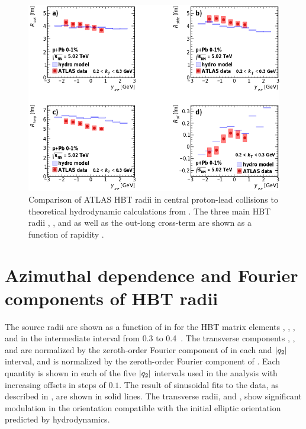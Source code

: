 \begin{figure}[t]
\centering
\includegraphics[width=\linewidth]{theory_bozek_kys.png}
\caption{Comparison of ATLAS HBT radii in central proton-lead collisions to theoretical hydrodynamic calculations from . The three main HBT radii \Rout, \Rside, and \Rlong as well as the out-long cross-term \Rol are shown as a function of rapidity \kys.}
\label{fig:results_theory_kys}
\end{figure}

\FloatBarrier
\section{Azimuthal dependence and Fourier components of HBT radii}

The source radii are shown as a function of \tdpk in \Fig{\ref{fig:Rosl_vs_phi}} for the \ac{HBT} matrix elements \Rout, \Rside, \Rlong, and \Ros in the intermediate \kt interval from 0.3 to 0.4\ \GeV.
The transverse components \Rout, \Rside, and \Ros are normalized by the zeroth-order Fourier component of \Rside in each \kt and $|q_{2}|$ interval, and \Rlong is normalized by the zeroth-order Fourier component of \Rlong.
Each quantity is shown in each of the five $|q_{2}|$ intervals used in the analysis with increasing offsets in steps of $0.1$.
The result of sinusoidal fits to the data, as described in \Sect{\ref{subsec:azi_correlations}}, are shown in solid lines.
The transverse radii, \Rout and \Rside, show significant modulation in the orientation compatible with the initial elliptic orientation predicted by hydrodynamics.

